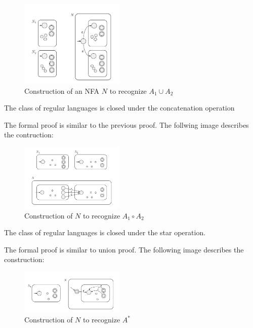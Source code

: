 \begin{figure}[h!]
    \begin{center}
        \includegraphics[width=5cm]{img/146.png}
        \caption{Construction of an NFA $N$ to recognize $A_1 \cup A_2$}
    \end{center}
\end{figure}

\begin{theorem}
    The class of regular languages is closed under the concatenation operation
\end{theorem}

The formal proof is similar to the previous proof. The follwing image describes
the contruction:

\begin{figure}[h!]
    \begin{center}
        \includegraphics[width=5cm]{img/148.png}
        \caption{Construction of $N$ to recognize $A_1 \circ A_2$}
    \end{center}
\end{figure}

\begin{theorem}
    The class of regular languages is closed under the star operation.
\end{theorem}

The formal proof is similar to union proof. The following image describes the
construction:

\begin{figure}[h!]
    \begin{center}
        \includegraphics[width=5cm]{img/150.png}
        \caption{Construction of $N$ to recognize $A^{*}$}
    \end{center}
\end{figure}

